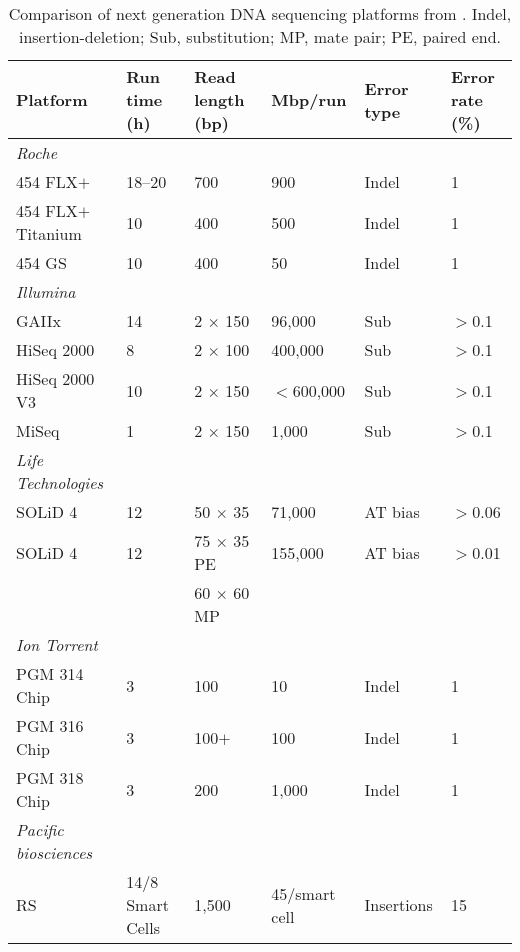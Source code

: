 \begin{table}
\footnotesize
\caption[Comparison of next generation \textsc{DNA} sequencing platforms]{Comparison of next generation \textsc{DNA} sequencing platforms from \citet{Scholz2012}. Indel, insertion-deletion; Sub, substitution; MP, mate pair; PE, paired end.
}
\label{tab:seq_tech}
\smallskip
\begin{tabularx}{\textwidth}{p{3cm}p{2.5cm}XXp{1.5cm}p{1.2cm}}
\toprule
\textbf{Platform} & \textbf{Run time (h)} & \textbf{Read length (bp)} & \textbf{Mbp/run} & \textbf{Error type} & \textbf{Error rate (\%)} \\
\midrule
\emph{Roche}             &        &                   &            &              &   \\
454 FLX$+$               & 18--20 & 700               & 900        & Indel        & 1 \\
454 FLX$+$ Titanium      &  10    & 400               & 500        & Indel        & 1 \\
454 GS                   &  10    & 400               & 50         & Indel        & 1 \\
\emph{Illumina}          &        &                   &            &              &  \\
GAIIx                    & 14     & 2 $\times$ 150    & 96,000     & Sub          & $>$0.1 \\
HiSeq 2000               & 8      & 2 $\times$ 100    & 400,000    & Sub          & $>$0.1 \\
HiSeq 2000 V3            & 10     & 2 $\times$ 150    & $<$600,000 & Sub          & $>$0.1 \\
MiSeq                    & 1      & 2 $\times$ 150    & 1,000      & Sub          & $>$0.1 \\
\emph{Life Technologies} &  &  &  &  &  \\
SOLiD 4                  & 12     & 50 $\times$ 35    & 71,000     & AT bias     & $>$0.06 \\
SOLiD 4                  & 12     & 75 $\times$ 35 PE & 155,000    & AT bias     & $>$0.01 \\
                         &        & 60 $\times$ 60 MP &            &             &  \\
\emph{Ion Torrent}       &        &                   &            &             &  \\
PGM 314 Chip             & 3      & 100               & 10         &  Indel      & 1 \\
PGM 316 Chip             & 3      & 100$+$            & 100        &  Indel      & 1 \\
PGM 318 Chip             & 3      & 200               & 1,000      &  Indel      & 1 \\
\emph{Pacific biosciences} &  &  &  &  &  \\
RS                       & 14/8 Smart Cells & 1,500 & 45/smart cell &  Insertions & 15 \\
\bottomrule
\end{tabularx}
\end{table}
